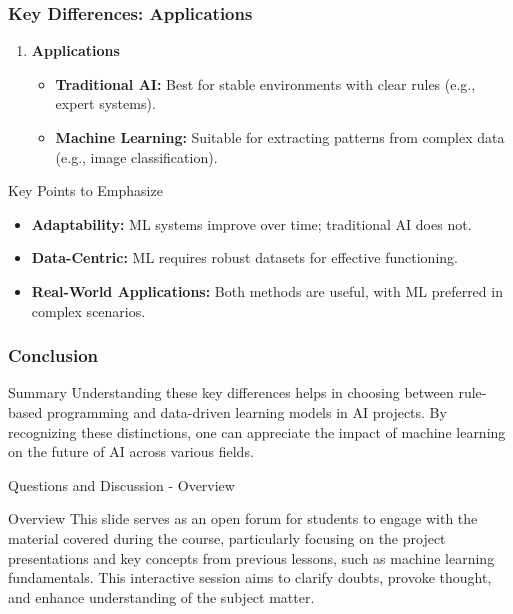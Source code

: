 \documentclass[aspectratio=169]{beamer}
\begin{document}
\begin{frame}[fragile]
    \frametitle{Key Differences: Applications}
    \begin{enumerate}
        \item \textbf{Applications}
            \begin{itemize}
                \item \textbf{Traditional AI:} Best for stable environments with clear rules (e.g., expert systems).
                \item \textbf{Machine Learning:} Suitable for extracting patterns from complex data (e.g., image classification).
            \end{itemize}
    \end{enumerate}

    \begin{block}{Key Points to Emphasize}
        \begin{itemize}
            \item \textbf{Adaptability:} ML systems improve over time; traditional AI does not.
            \item \textbf{Data-Centric:} ML requires robust datasets for effective functioning.
            \item \textbf{Real-World Applications:} Both methods are useful, with ML preferred in complex scenarios.
        \end{itemize}
    \end{block}
\end{frame}

\begin{frame}[fragile]
    \frametitle{Conclusion}
    \begin{block}{Summary}
        Understanding these key differences helps in choosing between rule-based programming and data-driven learning models in AI projects. 
        By recognizing these distinctions, one can appreciate the impact of machine learning on the future of AI across various fields.
    \end{block}
\end{frame}

\begin{frame}[fragile]{Questions and Discussion - Overview}
    \begin{block}{Overview}
    This slide serves as an open forum for students to engage with the material covered during the course, particularly focusing on the project presentations and key concepts from previous lessons, such as machine learning fundamentals. This interactive session aims to clarify doubts, provoke thought, and enhance understanding of the subject matter.
    \end{block}
\end{frame}
\end{document}
